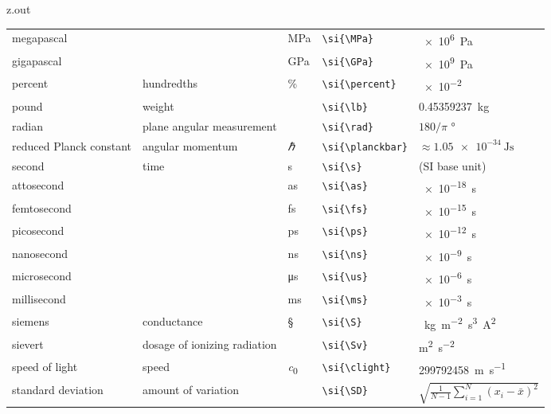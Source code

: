 \begin{VerbatimOut}{z.out}
{\begin{longtable}{@{}P{1.4in}P{1in}llP{1.8in}@{}}
    \qquad megapascal&
      \ditto&
      \si{\MPa}&
      \verb+\si{\MPa}+&
      \SI{e6}{\Pa}\\
    \qquad gigapascal&
      \ditto&
      \si{\GPa}&
      \verb+\si{\GPa}+&
      \SI{e9}{\Pa}\\
    \vsp
    percent&
      hundredths&
      \si{\percent}&
      \verb+\si{\percent}+&
      \SI{e-2}{}\\
    \vsp
    pound&
      weight&
      \si{\lb}&
      \verb+\si{\lb}+&
      \SI{.45359237}{\kg}\\  %
    \vsp
    radian&
      plane angular measurement&
      \si{\rad}&
      \verb+\si{\rad}+&
      \(180/\pi\) \unit{\degree\nounit}\\
    \vsp
    reduced Planck constant&
      angular momentum&
      \si{\planckbar}&
      \verb+\si{\planckbar}+&
      \(\approx \SI{1.05e-34}{\J\s}\)\\
    \vsp
    second&
      time&
      \si{\s}&
      \verb+\si{\s}+&
      (SI base unit)\\
    \quad attosecond&
      \ditto&
      \si{\as}&
      \verb+\si{\as}+&
      \SI{e-18}{\s}\\
    \quad femtosecond&
      \ditto&
      \si{\fs}&
      \verb+\si{\fs}+&
      \SI{e-15}{\s}\\
    \quad picosecond&
      \ditto&
      \si{\ps}&
      \verb+\si{\ps}+&
      \SI{e-12}{\s}\\
    \quad nanosecond&
      \ditto&
      \si{\ns}&
      \verb+\si{\ns}+&
      \SI{e-9}{\s}\\
    \quad microsecond&
      \ditto&
      \si{\us}&
      \verb+\si{\us}+&
      \SI{e-6}{\s}\\
    \quad millisecond&
      \ditto&
      \si{\ms}&
      \verb+\si{\ms}+&
      \SI{e-3}{\s}\\
    \vsp
    siemens&
      conductance&
      \si{\S}&
      \verb+\si{\S}+&
      \si{\per\kg\per\m\squared\s\cubed\A\squared}\\
    \vsp
    sievert&
      dosage of ionizing radiation&
      \si{\Sv}&
      \verb+\si{\Sv}+&
      \si{\m\squared\per\s\squared}\\
    \vsp
    speed of light&
      speed&
      \si{\clight}&
      \verb+\si{\clight}+&
      \SI{299792458}{\m\per\s}\\
    \vsp
    standard deviation&
      amount of variation&
      \si{\SD}&
      \verb+\si{\SD}+&
      $\displaystyle \sqrt{\frac 1{N-1} \sum_{i=1}^N(x_i-\bar x)^2}$\\

\end{longtable}}
\end{VerbatimOut}
